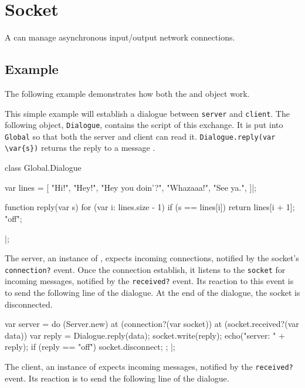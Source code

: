\section{Socket}

A  can manage asynchronous input/output network
connections.

\subsection{Example}

The following example demonstrates how both the  and
 object work.

This simple example will establish a dialogue between
\lstinline|server| and \lstinline|client|.  The following object,
\lstinline|Dialogue|, contains the script of this exchange.  It is put
into \lstinline|Global| so that both the server and client can read
it.  \lstinline|Dialogue.reply(var \var{s})| returns the reply to a
message .

\begin{urbiscript}[firstnumber=last]
class Global.Dialogue
{
  var lines =
  [
    "Hi!",
    "Hey!",
    "Hey you doin'?",
    "Whazaaa!",
    "See ya.",
  ]|;

  function reply(var s)
  {
    for (var i: lines.size - 1)
      if (s == lines[i])
        return lines[i + 1];
    "off";
  }
}|;
\end{urbiscript}

The server, an instance of , expects incoming
connections, notified by the socket's \lstinline|connection?| event.
Once the connection establish, it listens to the \lstinline|socket|
for incoming messages, notified by the \lstinline|received?| event.
Its reaction to this event is to send the following line of the
dialogue.  At the end of the dialogue, the socket is disconnected.

\begin{urbiscript}[firstnumber=last]
var server =
  do (Server.new)
  {
    at (connection?(var socket))
      at (socket.received?(var data))
      {
        var reply = Dialogue.reply(data);
        socket.write(reply);
        echo("server: " + reply);
        if (reply == "off")
          socket.disconnect;
      };
  }|;
\end{urbiscript}

The client, an instance of  expects incoming
messages, notified by the \lstinline|received?| event.  Its reaction
is to send the following line of the dialogue.

